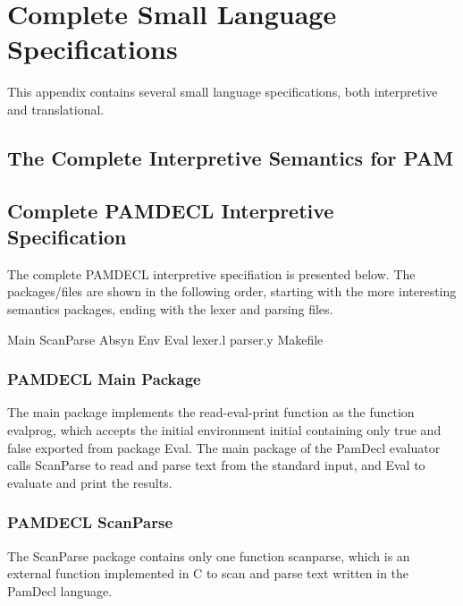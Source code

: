 \documentclass[10pt,a4]{article}
\begin{document}
\appendix

%

\section*{Complete Small Language Specifications}
This appendix contains several small language specifications, both interpretive and translational.

\subsection*{The Complete Interpretive Semantics for PAM}


\subsection*{Complete PAMDECL Interpretive Specification}
The complete PAMDECL interpretive specifiation is presented below. The packages/files are shown in the following order, starting with the more interesting semantics packages, ending with the lexer and parsing files.

Main
ScanParse
Absyn
Env
Eval
lexer.l
parser.y
Makefile

\subsubsection*{PAMDECL Main Package}
The main package implements the read-eval-print function as the function evalprog, which accepts the initial environment initial containing only true and false exported from package Eval.
The main package of the PamDecl evaluator calls ScanParse to read and parse text from the standard input, and Eval to evaluate and print the results.


\subsubsection*{PAMDECL ScanParse}
The ScanParse package contains only one function scanparse, which is an external function implemented in C to scan and parse text written in the PamDecl language.

\end{document}

